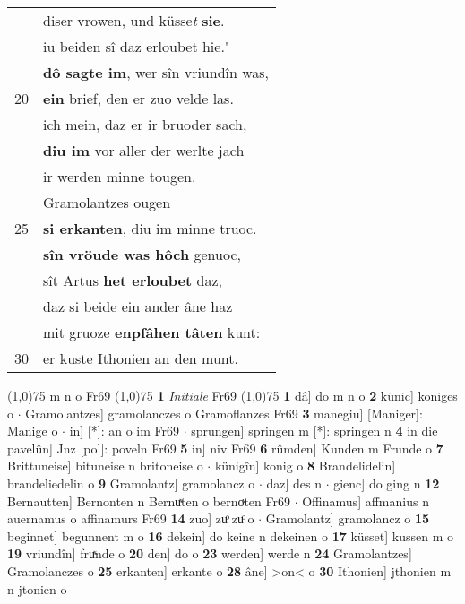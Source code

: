 \documentclass[8pt,a4paper,notitlepage]{article}
\begin{document}
\begin{table}[ht]
\begin{minipage}[t]{0.5\linewidth}
\begin{tabular}{rl}
 & diser vrowen, und küsse\textit{t} \textbf{sie}.\\ 
 & iu beiden sî daz erloubet hie."\\ 
 & \textbf{dô sagte im}, wer sîn vriundîn was,\\ 
20 & \textbf{ein} brief, den er zuo velde las.\\ 
 & ich mein, daz er ir bruoder sach,\\ 
 & \textbf{diu im} vor aller der werlte jach\\ 
 & ir werden minne tougen.\\ 
 & Gramolantzes ougen\\ 
25 & \textbf{si erkanten}, diu im minne truoc.\\ 
 & \textbf{sîn vröude was hôch} genuoc,\\ 
 & sît Artus \textbf{het erloubet} daz,\\ 
 & daz si beide ein ander âne haz\\ 
 & mit gruoze \textbf{enpfâhen tâten} kunt:\\ 
30 & er kuste Ithonien an den munt.\\ 
\end{tabular}
\scriptsize
\line(1,0){75} \newline
m n o Fr69 \newline
\line(1,0){75} \newline
\textbf{1} \textit{Initiale} Fr69  \newline
\line(1,0){75} \newline
\textbf{1} dâ] do m n o \textbf{2} künic] koniges o  $\cdot$ Gramolantzes] gramolanczes o Gramoflanzes Fr69 \textbf{3} manegiu] [Maniger]: Manige o  $\cdot$ in] [*]: an o im Fr69  $\cdot$ sprungen] springen m [*]: springen n \textbf{4} in die pavelûn] Jnz [pol]: poveln Fr69 \textbf{5} in] niv Fr69 \textbf{6} rûmden] Kunden m Frunde o \textbf{7} Brittuneise] bituneise n britoneise o  $\cdot$ künigîn] konig o \textbf{8} Brandelidelin] brandeliedelin o \textbf{9} Gramolantz] gramolancz o  $\cdot$ daz] des n  $\cdot$ gienc] do ging n \textbf{12} Bernautten] Bernonten n Bernuͯten o bernoͮten Fr69  $\cdot$ Offinamus] affmanius n auernamus o affinamurs Fr69 \textbf{14} zuo] zuͦ zuͦ o  $\cdot$ Gramolantz] gramolancz o \textbf{15} beginnet] begunnent m o \textbf{16} dekein] do keine n dekeinen o \textbf{17} küsset] kussen m o \textbf{19} vriundîn] fruͯnde o \textbf{20} den] do o \textbf{23} werden] werde n \textbf{24} Gramolantzes] Gramolanczes o \textbf{25} erkanten] erkante o \textbf{28} âne] >on< o \textbf{30} Ithonien] jthonien m n jtonien o \newline
\end{minipage}
\end{table}
\end{document}
